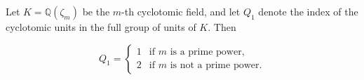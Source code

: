 Let $K = \mathbb{Q}(\zeta_m)$ be the $m$-th cyclotomic field, and let $Q_1$ denote the index of the cyclotomic units in the full group of units of $K$. Then

$$
Q_1 = \begin{cases}
1 & \text{if $m$ is a prime power}, \\
2 & \text{if $m$ is not a prime power}.
\end{cases}
$$
